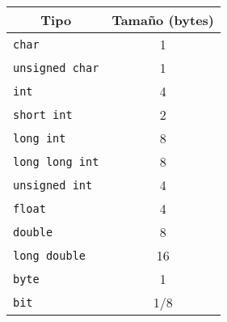 \documentclass[10pt]{article}
\begin{document}
        \begin{table}[h]
        \centering
        \begin{tabular}{|l|c|} 
        \hline
        \multicolumn{1}{|c|}{\textbf{Tipo}} & \textbf{Tamaño (bytes)}  \\ 
        \hline
        \texttt{char}                                & 1                        \\ 
        \hline
        \texttt{unsigned char}                       & 1                        \\ 
        \hline
        \texttt{int}                                 & 4                        \\ 
        \hline
        \texttt{short int}                           & 2                        \\ 
        \hline
        \texttt{long int}                            & 8                        \\ 
        \hline
        \texttt{long long int}                       & 8                        \\ 
        \hline
        \texttt{unsigned int}                        & 4                        \\ 
        \hline
        \texttt{float}                               & 4                        \\ 
        \hline
        \texttt{double}                              & 8                        \\ 
        \hline
        \texttt{long double}                         & 16                       \\
        \hline
        \texttt{byte}                         & 1                       \\
        \hline
        \texttt{bit}                         & 1/8                       \\
        \hline
        \end{tabular}
        \end{table}
\end{document}
